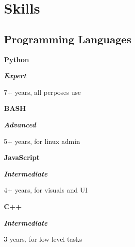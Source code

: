 \section{Skills}

\begin{multicols}{2}
\newcommand{\skill}[3]{
\parbox{0.02 \linewidth}{\hfill}
\parbox{0.19 \linewidth}{\textbf{#1}}
\parbox{0.24\linewidth}{\textit{#2}}
\parbox[t]{0.54\linewidth}{#3}
}



\newcommand{\skillplus}[4]{
\parbox{0.02 \linewidth}{\hfill}
\parbox{0.19 \linewidth}{\textbf{#1}}
\parbox{0.24\linewidth}{#2}
\parbox[t]{0.54\linewidth}{#3}
\\
\parbox[t]{0.05\linewidth}{\hfill}\parbox[t]{0.95\linewidth}{#4}
}


\subsection{Programming Languages}

\newcommand{\expert}{\textbf{\color{expert} Expert} }

\newcommand{\advanced}{\textbf{\color{advanced} Advanced} }

\newcommand{\intermediate}{\textbf{\color{intermediate} Intermediate} }

\newcommand{\proficient}{\textbf{\color{proficient} Proficient} }

\skill{Python}{\expert{}}{7+ years, all perposes use}%

\skill{BASH}{\advanced{}}{5+ years, for linux admin}%

\skill{JavaScript}{\intermediate{}}{4+ years, for visuals and UI}%

\skill{C++}{\intermediate{}}{3 years, for low level tasks}%



\end{multicols}
